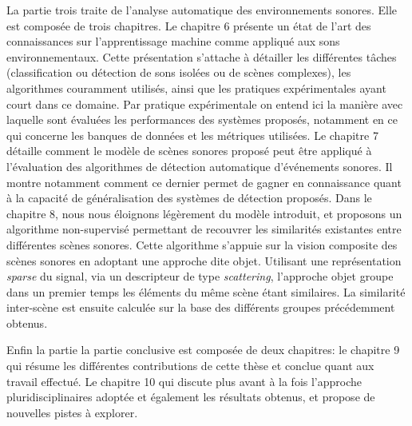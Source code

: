 La partie trois traite de l'analyse automatique des environnements sonores. Elle est composée de trois chapitres. Le chapitre 6 présente un état de l'art des connaissances sur l'apprentissage machine comme appliqué aux sons environnementaux. Cette présentation s'attache à détailler les différentes tâches (classification ou détection de sons isolées ou de scènes complexes), les algorithmes couramment utilisés, ainsi que les pratiques expérimentales ayant court dans ce domaine. Par pratique expérimentale on entend ici la manière avec laquelle sont évaluées les performances des systèmes proposés, notamment en ce qui concerne les banques de données  et les métriques utilisées. Le chapitre 7 détaille comment le modèle de scènes sonores proposé peut être appliqué à l'évaluation des algorithmes de détection automatique d'événements sonores. Il montre  notamment comment ce dernier permet de gagner en connaissance quant à la capacité de généralisation des systèmes de détection proposés. Dans le chapitre 8, nous nous éloignons légèrement du modèle introduit, et proposons un algorithme non-supervisé permettant de recouvrer les similarités existantes entre différentes scènes sonores. Cette algorithme s'appuie sur la vision composite des scènes sonores en adoptant une approche dite objet. Utilisant une représentation \emph{sparse} du signal, via un descripteur de type \emph{scattering}, l'approche objet groupe dans un premier temps les éléments du même scène étant similaires. La similarité inter-scène est ensuite calculée sur la base des différents groupes précédemment obtenus. 

Enfin la partie la partie conclusive est composée de deux chapitres: le chapitre 9 qui résume les différentes contributions de cette thèse et conclue quant aux travail effectué. Le chapitre 10 qui discute plus avant à la fois l'approche pluridisciplinaires adoptée et également les résultats obtenus, et propose de nouvelles pistes à explorer.





